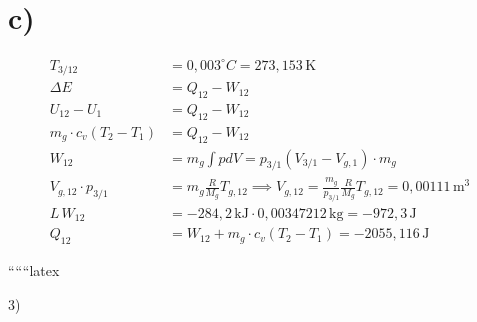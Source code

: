 

\section*{c)}

\begin{align*}
T_{3/12} &= 0,003^\circ C = 273,153 \, \text{K} \\
\Delta E &= Q_{12} - W_{12} \\
U_{12} - U_1 &= Q_{12} - W_{12} \\
m_g \cdot c_v (T_2 - T_1) &= Q_{12} - W_{12} \\
W_{12} &= m_g \int pdV = p_{3/1} (V_{3/1} - V_{g,1}) \cdot m_g \\
V_{g,12} \cdot p_{3/1} &= m_g \frac{R}{M_g} T_{g,12} \implies V_{g,12} = \frac{m_g}{p_{3/1}} \frac{R}{M_g} T_{g,12} = 0,00111 \, \text{m}^3 \\
L \, W_{12} &= -284,2 \, \text{kJ} \cdot 0,00347212 \, \text{kg} = -972,3 \, \text{J} \\
Q_{12} &= W_{12} + m_g \cdot c_v (T_2 - T_1) = -2055,116 \, \text{J}
\end{align*}

``````latex


3) \\